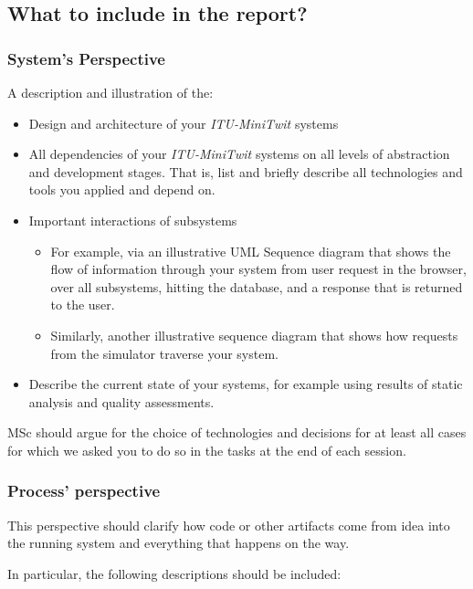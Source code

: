 \newpage

\subsection{What to include in the report?}

\subsubsection{System's Perspective}

A description and illustration of the:

\begin{itemize}
    \item Design and architecture of your \textit{ITU-MiniTwit} systems
    \item All dependencies of your \textit{ITU-MiniTwit} systems on all levels of abstraction and development stages. That is, list and briefly describe all technologies and tools you applied and depend on.
    \item Important interactions of subsystems
    \begin{itemize}
        \item For example, via an illustrative UML Sequence diagram that shows the flow of information through your system from user request in the browser, over all subsystems, hitting the database, and a response that is returned to the user.
        \item Similarly, another illustrative sequence diagram that shows how requests from the simulator traverse your system.
    \end{itemize}
    \item Describe the current state of your systems, for example using results of static analysis and quality assessments.
\end{itemize}
MSc should argue for the choice of technologies and decisions for at least all cases for which we asked you to do so in the tasks at the end of each session.

\subsubsection{Process' perspective}

This perspective should clarify how code or other artifacts come from idea into the running system and everything that happens on the way.

In particular, the following descriptions should be included:


